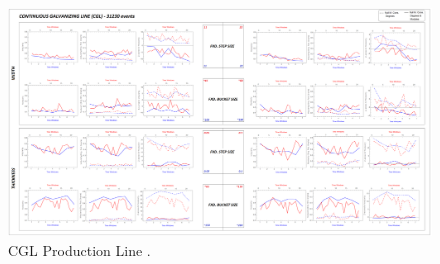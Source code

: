 \begin{landscape}
\begin{figure}[ht]
	\centering
	\includegraphics[width=1.35\textwidth]{../images/supplements-CGL_real_life_events_analysis-results-curves_and_time_resolutions.png}
	\caption{CGL Production Line \cc{} \dd{}.}
	\label{figure-supplements-CGL-curveplots_sliding}
\end{figure}
\end{landscape}